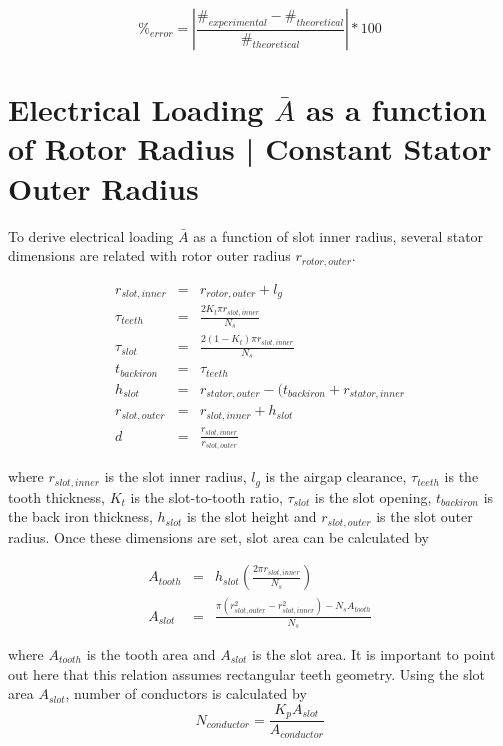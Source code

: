 \documentclass[a4paper, 11pt, titlepage]{article}
\begin{document}
\begin{equation}
	\%_{error}=|\frac{\#_{experimental}-\#_{theoretical}}{\#_{theoretical}}|*100
	\label{eq:errorCalculation}
\end{equation}


\section{Electrical Loading $\bar{A}$ as a function of Rotor Radius | Constant Stator Outer Radius}
\label{app:torquevsRotorRadius}

To derive electrical loading $\bar{A}$ as a function of slot inner radius, several stator dimensions are related with rotor outer radius $r_{rotor,outer}$.

\begin{eqnarray}
	r_{slot, inner} &=& r_{rotor,outer} + l_g \\
	\tau_{teeth} &=& \frac{2K_t\pi r_{slot,inner}}{N_s} \\
	\tau_{slot} &=& \frac{2(1-K_t)\pi r_{slot,inner}}{N_s} \\
	t_{back iron} &=& \tau_{teeth} \\
	h_{slot} &=& r_{stator,outer}-(t_{back iron}+r_{stator,inner} \\
	r_{slot,outer} &=& r_{slot,inner}+h_{slot} \\
	d &=& \frac{r_{slot,inner}}{r_{slot,outer}}
	\label{eq:machineDimensions}
\end{eqnarray}

where $r_{slot, inner}$ is the slot inner radius, $l_g$ is the airgap clearance, $\tau_{teeth}$ is the tooth thickness, $K_t$ is the slot-to-tooth ratio, $\tau_{slot}$ is the slot opening, $t_{back iron}$ is the back iron thickness, $h_{slot}$ is the slot height and $r_{slot,outer}$ is the slot outer radius. Once these dimensions are set, slot area can be calculated by

\begin{eqnarray}
	A_{tooth} &=& h_{slot}(\frac{2\pi r_{slot,inner}}{N_s}) \\
	A_{slot} &=& \frac{\pi(r^2_{slot,outer}-r^2_{slot,inner})-N_sA_{tooth}}{N_s}
\end{eqnarray}

where $A_{tooth}$ is the tooth area and $A_{slot}$ is the slot area. It is important to point out here that this relation assumes rectangular teeth geometry.
Using the slot area $A_{slot}$, number of conductors is calculated by
\begin{equation}
	N_{conductor} = \frac{K_pA_{slot}}{A_{conductor}}
\end{equation}
\end{document}

